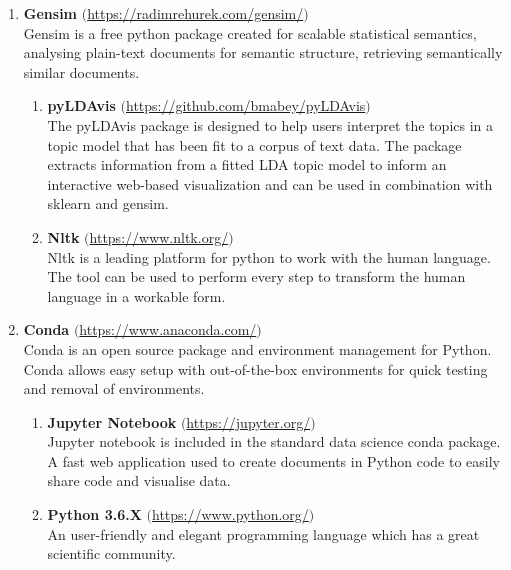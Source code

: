 \begin{enumerate}
    \item \textbf{Gensim}  $($\url{https://radimrehurek.com/gensim/}$)$ \\
    Gensim is a free python package created for scalable statistical semantics, analysing plain-text documents for semantic structure, retrieving semantically similar documents.
    \begin{enumerate}
    \item \textbf{pyLDAvis} $($\url{https://github.com/bmabey/pyLDAvis}$)$\\
        The pyLDAvis package is designed to help users interpret the topics in a topic model that has been fit to a corpus of text data. The package extracts information from a fitted LDA topic model to inform an interactive web-based visualization and can be used in combination with sklearn and gensim.
    \item \textbf{Nltk} $($\url{https://www.nltk.org/}$)$\\
        Nltk is a leading platform for python to work with the human language. The tool can be used to perform every step to transform the human language in a workable form. 
    \end{enumerate}
    
    
    \item \textbf{Conda} $($\url{https://www.anaconda.com/}$)$ \\
    Conda is an open source package and environment management for Python. Conda allows easy setup with out-of-the-box environments for quick testing and removal of environments.
    \begin{enumerate}
        \item \textbf{Jupyter Notebook} $($\url{https://jupyter.org/}$)$ \\
        Jupyter notebook is included in the standard data science conda package. A fast web application used to create documents in Python code to easily share code and visualise data.
        \item \textbf{Python 3.6.X} $($\url{https://www.python.org/}$)$\\
        An user-friendly and elegant programming language which has a great scientific community.
    \end{enumerate}
    
\end{enumerate}